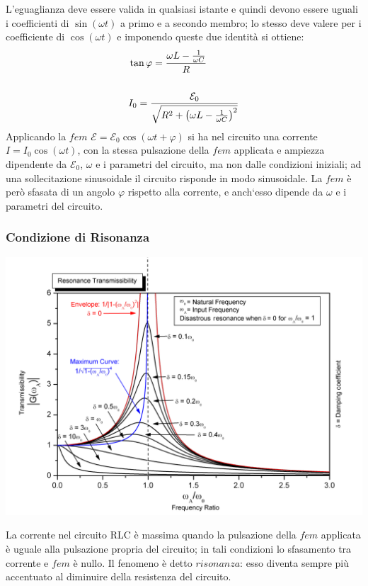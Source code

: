 L'eguaglianza deve essere valida in qualsiasi istante e quindi devono essere uguali i coefficienti di $\sin(\omega t)$ a primo e a secondo membro; lo stesso deve valere per i coefficiente di $\cos(\omega t)$ e imponendo queste due identit\`a si ottiene:
\newpage
\begin{align}
	& \tan \varphi = \frac{\omega L - \frac{1}{\omega C}}{R} \\ \rule{0pt}{30pt}
	& I_0 = \frac{\mathcal{E}_0}{\sqrt{R^2 + \left(\omega L - \frac{1}{\omega C}\right)^2}}
\end{align}
Applicando la $fem$ $\mathcal{E} = \mathcal{E}_0 \cos(\omega t + \varphi)$ si ha nel circuito una corrente $I = I_0 \cos(\omega t)$, con la stessa pulsazione della $fem$ applicata e ampiezza dipendente da $\mathcal{E}_0$, $\omega$ e i parametri del circuito, ma non dalle condizioni iniziali; ad una sollecitazione sinusoidale il circuito risponde in modo sinusoidale. La $fem$ \`e per\`o sfasata di un angolo $\varphi$ rispetto alla corrente, e anch`esso dipende da $\omega$ e i parametri del circuito.

\subsubsection{Condizione di Risonanza}
\begin{center}
	\includegraphics[width = 15cm]{images/resonance}
\end{center}
La corrente nel circuito RLC \`e massima quando la pulsazione della $fem$ applicata \`e uguale alla pulsazione propria del circuito; in tali condizioni lo sfasamento tra corrente e $fem$ \`e nullo. Il fenomeno \`e detto $risonanza$: esso diventa sempre pi\`u accentuato al diminuire della resistenza del circuito.

